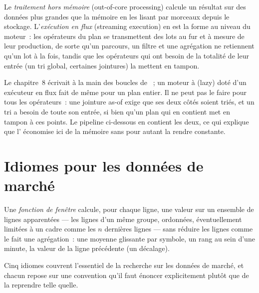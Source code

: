\begin{definition}\label{def:pl:dataframes:outofcore}
Le \emph{traitement hors mémoire} (out-of-core processing) calcule un résultat sur des données plus grandes que la mémoire en les lisant par morceaux
depuis le stockage. L'\emph{exécution en flux} (streaming execution) en est la forme au niveau du moteur~: les opérateurs du plan se transmettent des lots
au fur et à mesure de leur production, de sorte qu'un parcours, un filtre et une agrégation ne retiennent qu'un lot à la fois, tandis que les opérateurs qui ont besoin
de la totalité de leur entrée (un tri global, certaines jointures) la mettent en tampon.
\end{definition}

Le chapitre~8 écrivait à la main des boucles de ~; un moteur à  (lazy) doté d'un exécuteur en flux fait de même pour un plan entier. Il ne peut pas le faire
pour tous les opérateurs~: une jointure as-of exige que ses deux côtés soient triés, et un tri a besoin de toute son entrée, si bien qu'un plan qui en contient met en tampon à ces
points. Le pipeline ci-dessous en contient les deux, ce qui explique que l' économise ici de la mémoire sans pour autant la rendre constante.

\section{Idiomes pour les données de marché}

\begin{definition}\label{def:pl:dataframes:window}
Une \emph{fonction de fenêtre} calcule, pour chaque ligne, une valeur sur un ensemble de lignes apparentées --- les lignes d'un même
groupe, ordonnées, éventuellement limitées à un cadre comme les $n$ dernières lignes --- sans réduire les lignes comme le fait une agrégation~:
une moyenne glissante par symbole, un rang au sein d'une minute, la valeur de la ligne précédente (un décalage).
\end{definition}

Cinq idiomes couvrent l'essentiel de la recherche sur les données de marché, et chacun repose sur une convention qu'il faut énoncer explicitement plutôt que de la reprendre telle quelle.

